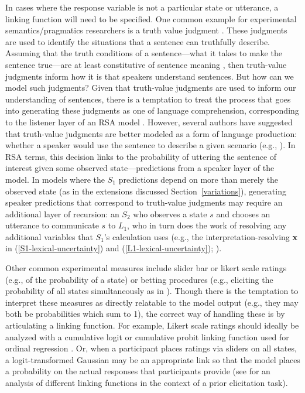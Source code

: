 \documentclass{sp}
\begin{document}
In cases where the response variable is not a particular state or utterance, a linking function will need to be specified. One common example for experimental semantics/pragmatics researchers is a truth value judgment \citep{crainmckee1985,crainthornton1998}. These judgments are used to identify the situations that a sentence can truthfully describe. Assuming that the truth conditions of a sentence---what it takes to make the sentence true---are at least constitutive of sentence meaning \citep[e.g.,][]{chierchiamcconnellginet2000}, then truth-value judgments inform how it is that speakers understand sentences. But how can we model such judgments? Given that truth-value judgments are used to inform our understanding of sentences, there is a temptation to treat the process that goes into generating these judgments as one of language comprehension, corresponding to the listener layer of an RSA model \citep[e.g.][]{PottsLassiter2016:Embedded-implic}. However, several authors have suggested that truth-value judgments are better modeled as a form of language production: whether a speaker would use the sentence to describe a given scenario (e.g., \citealp{degengoodman2014,Franke2016:Task-types-link,savinellietal2017,tesslergoodman2019,jasbietal2019}). In RSA terms, this decision links to the probability of uttering the sentence of interest given some observed state---predictions from a speaker layer of the model. In models where the $S_1$ predictions depend on more than merely the observed state (as in the extensions discussed Section~\ref{variations}), generating speaker predictions that correspond to truth-value judgments may require an additional layer of recursion: an $S_2$ who observes a state $s$ and chooses an utterance to communicate $s$ to $L_1$, who in turn does the work of resolving any additional variables that $S_1$'s calculation uses (e.g., the interpretation-resolving \textbf{x} in (\ref{S1-lexical-uncertainty}) and (\ref{L1-lexical-uncertainty}); \citealp{savinellietal2017}).

Other common experimental measures include slider bar or likert scale ratings (e.g., of the probability of a state) or betting procedures (e.g., eliciting the probability of all states simultaneously as in \citealp{frankgoodman2012}). 
Though there is the temptation to interpret these measures as directly relatable to the model output (e.g., they may both be probabilities which sum to 1), the correct way of handling these is by articulating a linking function.
For example, Likert scale ratings should ideally be analyzed with a cumulative logit or cumulative probit linking function used for ordinal regression \citep{Franke2014:Typical-use-of-,Franke2016:Task-types-link}.
Or, when a participant places ratings via sliders on all states, a logit-transformed Gaussian may be an appropriate link so that the model places a probability on the actual responses that participants provide (see \citealp{franke2016does} for an analysis of different linking functions in the context of a prior elicitation task).
\end{document}
